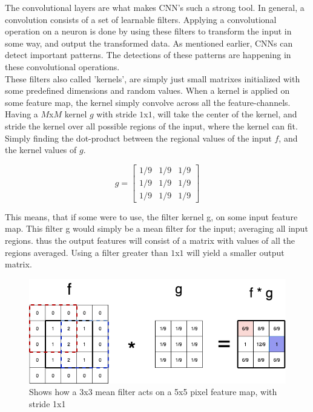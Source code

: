 The convolutional layers are what makes CNN's such a strong tool. In general, a convolution consists of a set of learnable filters. Applying a convolutional operation on a neuron is done by using these filters to transform the input in some way, and output the transformed data. As mentioned earlier, CNNs can detect important patterns. The detections of these patterns are happening in these convolutional operations.\\

\noindent
These filters also called 'kernels', are simply just small matrixes initialized with some predefined dimensions and random values. When a kernel is applied on some feature map, the kernel simply convolve across all the feature-channels.\\

\noindent
Having a $M$x$M$ kernel $g$ with stride $1$x$1$, will take the center of the kernel, and stride the kernel over all possible regions of the input, where the kernel can fit. Simply finding the dot-product between the regional values of the input $f$, and the kernel values of $g$.

$$ g = \begin{bmatrix}
1/9 & 1/9 & 1/9 \\
1/9 & 1/9 & 1/9 \\
1/9 & 1/9 & 1/9
\end{bmatrix}
$$

\noindent
This means, that if some were to use, the filter kernel g, on some input feature map. This filter g would simply be a mean filter for the input; averaging all input regions. thus the output features will consist of a matrix with values of all the regions averaged. Using a filter greater than $1$x$1$ will yield a smaller output matrix.

\begin{figure}[!ht]
  \centering
  \includegraphics[scale=0.4]{latex/IMGs/conv1.png}
  \caption{Shows how a 3x3 mean filter acts on a 5x5 pixel feature map, with stride 1x1}\label{Baseline:before}
\end{figure}

